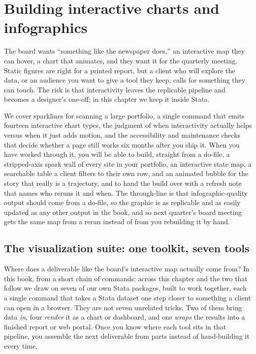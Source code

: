 \documentclass[
    a4paper,
    fontsize=10pt,
    twoside=true,
    numbers=noenddot,
]{kaobook}
\begin{document}
\chapter{Building interactive charts and infographics}\label{ch:interactive}

The board wants \enquote{something like the newspaper does,} an interactive map they can hover, a chart that animates, and they want it for the quarterly meeting. Static figures are right for a printed report, but a client who will explore the data, or an audience you want to give a tool they keep, calls for something they can touch. The risk is that interactivity leaves the replicable pipeline and becomes a designer's one-off; in this chapter we keep it inside Stata.

We cover sparklines for scanning a large portfolio, a single command that emits fourteen interactive chart types, the judgment of when interactivity actually helps versus when it just adds motion, and the accessibility and maintenance checks that decide whether a page still works six months after you ship it. When you have worked through it, you will be able to build, straight from a do-file, a stripped-axis spark wall of every site in your portfolio, an interactive state map, a searchable table a client filters to their own row, and an animated bubble for the story that really is a trajectory, and to hand the build over with a refresh note that names who reruns it and when. The through-line is that infographic-quality output should come from a do-file, so the graphic is as replicable and as easily updated as any other output in the book, and so next quarter's board meeting gets the same map from a rerun instead of from you rebuilding it by hand.

\section{The visualization suite: one toolkit, seven tools}\label{sec:suite}
Where does a deliverable like the board's interactive map actually come from? In this book, from a short chain of commands: across this chapter and the two that follow we draw on seven of our own Stata packages, built to work together, each a single command that takes a Stata dataset one step closer to something a client can open in a browser. They are not seven unrelated tricks. Two of them bring data \emph{in}, four \emph{render} it as a chart or dashboard, and one \emph{wraps} the results into a finished report or web portal. Once you know where each tool sits in that pipeline, you assemble the next deliverable from parts instead of hand-building it every time.
\end{document}
